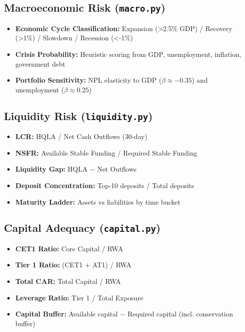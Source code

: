 \documentclass[12pt,a4paper]{article}
\begin{document}
\subsection{Macroeconomic Risk (\texttt{macro.py})}

\begin{itemize}
    \item \textbf{Economic Cycle Classification:} Expansion (>2.5\% GDP) / Recovery (>1\%) / Slowdown / Recession (<-1\%)
    \item \textbf{Crisis Probability:} Heuristic scoring from GDP, unemployment, inflation, government debt
    \item \textbf{Portfolio Sensitivity:} NPL elasticity to GDP ($\beta \approx -0.35$) and unemployment ($\beta \approx 0.25$)
\end{itemize}

\subsection{Liquidity Risk (\texttt{liquidity.py})}

\begin{itemize}
    \item \textbf{LCR:} HQLA / Net Cash Outflows (30-day)
    \item \textbf{NSFR:} Available Stable Funding / Required Stable Funding
    \item \textbf{Liquidity Gap:} HQLA $-$ Net Outflows
    \item \textbf{Deposit Concentration:} Top-10 deposits / Total deposits
    \item \textbf{Maturity Ladder:} Assets vs liabilities by time bucket
\end{itemize}

\subsection{Capital Adequacy (\texttt{capital.py})}

\begin{itemize}
    \item \textbf{CET1 Ratio:} Core Capital / RWA
    \item \textbf{Tier 1 Ratio:} (CET1 + AT1) / RWA
    \item \textbf{Total CAR:} Total Capital / RWA
    \item \textbf{Leverage Ratio:} Tier 1 / Total Exposure
    \item \textbf{Capital Buffer:} Available capital $-$ Required capital (incl. conservation buffer)
\end{itemize}
\end{document}
